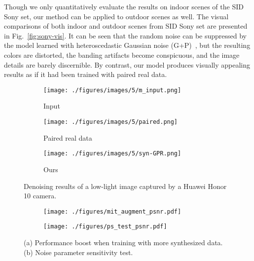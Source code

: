 \documentclass[10pt,twocolumn,letterpaper]{article}
\begin{document}
Though we only quantitatively evaluate the results on indoor scenes of the SID Sony set,  our method can be applied to outdoor scenes as well. 
The visual comparisons of both indoor and outdoor scenes from SID Sony set are presented in Fig.~\ref{fig:sony-vis}. 
It can be seen that the random noise can be suppressed by the model learned with heteroscedastic Gaussian noise (G+P)~\cite{Foi2008Practical},  but the resulting colors are distorted, the banding artifacts become conspicuous, and the image details are barely discernible.  By contrast, our model produces visually appealing results as if it had been trained with paired real data. 


\begin{figure}[!t]
	\centering
	\begin{subfigure}[b]{.32\linewidth}
		\centering
		\texttt{[image: ./figures/images/5/m\_input.png]}
		\caption{Input}
	\end{subfigure}
	\begin{subfigure}[b]{.32\linewidth}
		\centering
		\texttt{[image: ./figures/images/5/paired.png]}
		\caption{Paired real data}
	\end{subfigure}
	\begin{subfigure}[b]{.32\linewidth}
		\centering
		\texttt{[image: ./figures/images/5/syn-GPR.png]}
		\caption{Ours}
	\end{subfigure}
	\caption{Denoising results of a low-light image captured by a Huawei Honor 10 camera.}
	\label{fig:smartphone}
\end{figure}

\begin{figure}[!t]
	\centering
	\begin{subfigure}[b]{.45\linewidth}
		\centering
		\texttt{[image: ./figures/mit\_augment\_psnr.pdf]}
		\caption{}
		\label{fig:mit5k}
	\end{subfigure}
	\begin{subfigure}[b]{.45\linewidth}
		\centering
		\texttt{[image: ./figures/ps\_test\_psnr.pdf]}
		\caption{}
		\label{fig: parameter-sensitivity}
	\end{subfigure}
	\vspace{-2mm}
	\caption{(a) Performance boost when training with more synthesized data. (b) Noise parameter sensitivity test. }
	\vspace{-3mm}
\end{figure}
\end{document}
